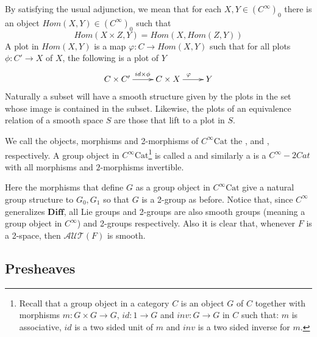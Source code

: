 

By satisfying the usual adjunction, we mean that for each $X,Y\in (C^\infty)_0$ there is an object $Hom(X,Y)\in (C^\infty)_0$ such that \[
                                                                               Hom(X\times Z,Y)=Hom(X,Hom(Z,Y))
                                                                              \]
A plot in $Hom(X,Y)$ is a map $\varphi:C\rightarrow Hom(X,Y)$ such that for all plots $\phi:C'\rightarrow X$ of $X$, the following is a plot of $Y$\[
                                                                                                                                                   \xymatrix{C\times C' \ar[r]^{id\times \phi} & C\times X \ar[r]^\varphi & Y}
                                                                                                                                                   \]
Naturally a subset will have a smooth structure given by the plots in the set whose image is contained in the subset. Likewise, the plots of an equivalence relation of a smooth space $S$ are those that lift to a plot in $S$.

\begin{definition}
 We call the objects, morphisms and 2-morphisms of $C^\infty\text{Cat}$ the ,  and , respectively. A group object in $C^\infty\text{Cat}$\footnote{Recall that a group object in a category $C$ is an object $G$ of $C$ together with morphisms $m:G\times G\rightarrow G$, $id:1\rightarrow G$ and $inv:G\rightarrow G$ in $C$ such that: $m$ is associative, $id$ is a two sided unit of $m$ and $inv$ is a two sided inverse for $m$.} is called a  and similarly a  is a $C^\infty-2Cat$ with all morphisms and $2$-morphisms invertible.
\end{definition}
Here the morphisms that define $G$ as a group object in $C^\infty\text{Cat}$ give a natural group structure to $G_0,G_1$ so that $G$ is a 2-group as before.
Notice that, since $C^\infty$ generalizes $\mathbf{Diff}$, all Lie groups and 2-groups are also smooth groups  (meaning a group object in $C^\infty$) and 2-groups respectively. Also it is clear that, whenever $F$ is a 2-space, then $\mathcal{AUT}(F)$ is smooth.

\subsection{Presheaves}

